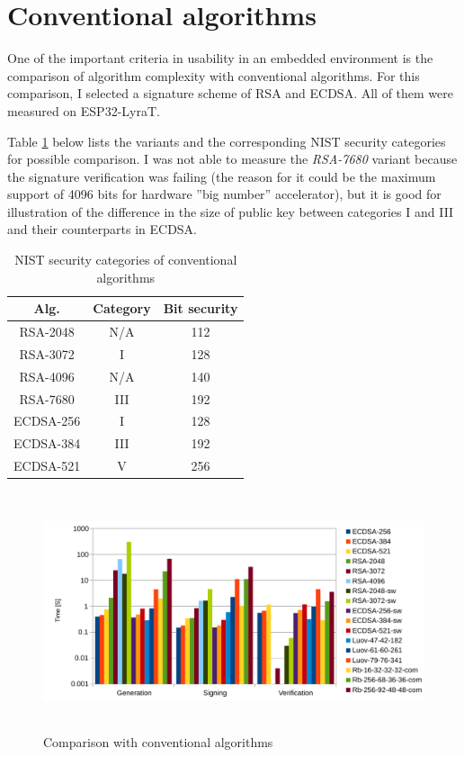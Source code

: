 \documentclass[thesis=M,english]{FITthesis}[2019/12/23]
\begin{document}
\section{Conventional algorithms}
One of the important criteria in usability in an embedded environment is the comparison of algorithm complexity with conventional algorithms. For this comparison, I selected a signature scheme of RSA and ECDSA. All of them were measured on ESP32-LyraT. 

\bigskip
\noindent
Table \ref{conv-NIST-sec-cate} below lists the variants and the corresponding NIST security categories for possible comparison. \cite{L-NIST-RECOMM} I was not able to measure the \textit{RSA-7680} variant because the signature verification was failing (the reason for it could be the maximum support of 4096 bits for hardware ”big number” accelerator), but it is good for illustration of the difference in the size of public key between categories I and III and their counterparts in ECDSA. 
\begin{table}[H]
\centering
\begin{tabular}{|c|c|c|}
\hline
Alg. & Category & Bit security \\ \hline
RSA-2048 & N/A & 112 \\ \hline
RSA-3072 & I & 128 \\ \hline
RSA-4096 & N/A & 140 \\ \hline
RSA-7680 & III & 192 \\ \hline
ECDSA-256 & I & 128 \\ \hline
ECDSA-384 & III & 192 \\ \hline
ECDSA-521 & V & 256 \\ \hline
\end{tabular}
\caption{NIST security categories of conventional algorithms}
\label{conv-NIST-sec-cate}
\end{table}

\begin{figure}[H]
\centering
\includegraphics[width=13cm,height=7cm]{images/time-all.pdf}
\caption{Comparison with conventional algorithms}
\label{time-all}
\end{figure}
\end{document}
